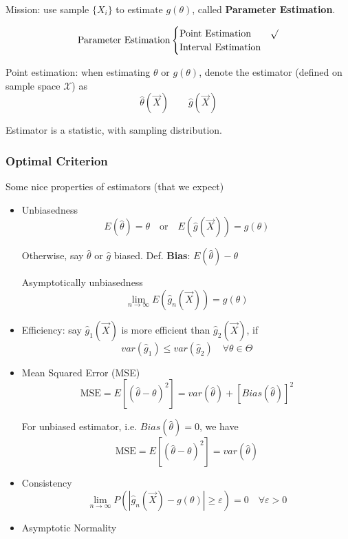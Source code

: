     Mission: use sample $\{X_i\}$ to estimate $g(\theta)$, called \textbf{Parameter Estimation}.

    \[
        \text{Parameter Estimation}\begin{cases}
            \text{Point Estimation}& \surd\\
            \text{Interval Estimation}&
        \end{cases}    
    \]

    Point estimation: when estimating $\theta$ or $g(\theta)$, denote the estimator (defined on sample space $\mathscr{X}$) as
    \[
        \hat{\theta}(\vec{X})\qquad \hat{g}(\vec{X})    
    \]

    Estimator is a statistic, with sampling distribution.
\subsubsection{Optimal Criterion}\label{SubSectionOptimalCriterion}
        Some nice properties of estimators (that we expect)
    \begin{itemize}
        \item Unbiasedness
        \[
            E(\hat{\theta})=\theta   \quad \text{or}\quad E(\hat{g}(\vec{X})) =g(\theta)
        \]

        Otherwise, say $\hat{\theta}$ or $\hat{g}$ biased. Def. \textbf{Bias}: $E(\hat{\theta})-\theta$

        Asymptotically unbiasedness
        \[
            \lim_{n\to\infty}  E(\hat{g}_n(\vec{X})) =g(\theta)  
        \]
        \item Efficiency: say $\hat{g}_1(\vec{X})$ is more efficient than $\hat{g}_2(\vec{X})$, if
        \[
            var(\hat{g}_1)\leq var(\hat{g}_2)  \quad\forall\theta\in\Theta  
        \]
        \item Mean Squared Error (MSE)
        \[
            \text{MSE}=E[(\hat{\theta}-\theta)^2]=var(\hat{\theta})+[Bias(\hat{\theta})]^2
        \]

        For unbiased estimator, i.e. $Bias(\hat{\theta})=0$, we have
        \[
            \text{MSE}=E[(\hat{\theta}-\theta)^2]=var(\hat{\theta})
        \]
        \item Consistency
        \[
            \lim_{n\to\infty}P(|\hat{g}_n(\vec{X})-g(\theta)|\geq \varepsilon)=0\quad\forall\varepsilon>0    
        \]
        \item Asymptotic Normality
    \end{itemize}


